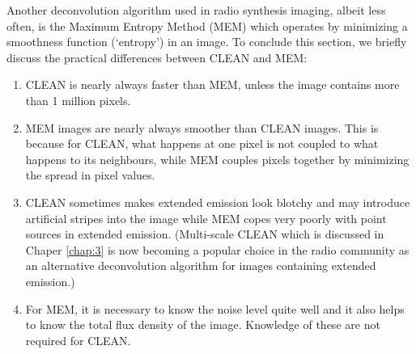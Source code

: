 Another deconvolution algorithm used in radio synthesis imaging, albeit less often, is the Maximum Entropy Method (MEM) which operates by minimizing a smoothness function (`entropy') in an image. To conclude this section, we briefly discuss the practical differences between CLEAN and MEM:
\begin{enumerate}
\item CLEAN is nearly always faster than MEM, unless the image contains more than 1 million pixels.
\item MEM images are nearly always smoother than CLEAN images. This is because for CLEAN, what happens at one pixel is not coupled to what happens to its neighbours, while MEM couples pixels together by minimizing the spread in pixel values.
\item CLEAN sometimes makes extended emission look blotchy and may introduce artificial stripes into the image while MEM copes very poorly with point sources in extended emission. (Multi-scale CLEAN which is discussed in Chaper \ref{chap:3} is now becoming a popular choice in the radio community as an alternative deconvolution algorithm for images containing extended emission.)
\item For MEM, it is necessary to know the noise level quite well and it also helps to know the total flux density of the image. Knowledge of these are not required for CLEAN.
\end{enumerate}
